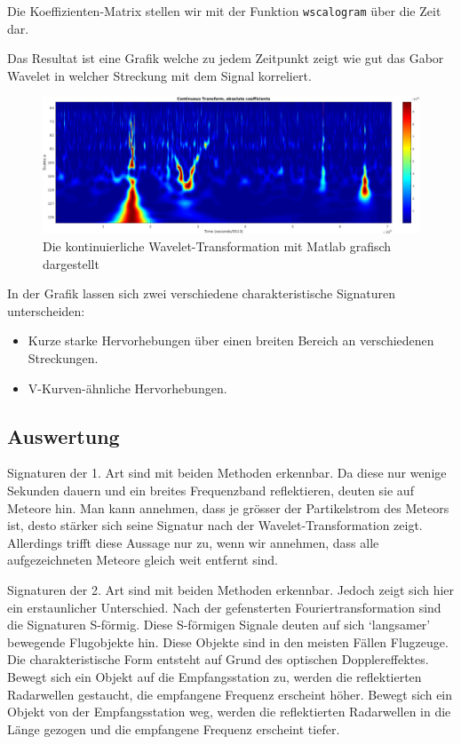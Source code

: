 \begin{refsection}
Die Koeffizienten-Matrix stellen wir mit der Funktion \texttt{wscalogram} über die Zeit dar.

Das Resultat ist eine Grafik welche zu jedem Zeitpunkt zeigt wie gut das Gabor Wavelet in welcher Streckung mit dem Signal korreliert. 

\begin{figure}
	\centering
	\includegraphics[width=\linewidth]{papers/meteor/images/signal_wscalo-clipped.png}
	\caption{Die kontinuierliche Wavelet-Transformation mit Matlab grafisch dargestellt}
	\label{fig:signalmitwscalo}
\end{figure}
In der Grafik lassen sich zwei verschiedene charakteristische Signaturen unterscheiden:
\begin{itemize}
	\item Kurze starke Hervorhebungen über einen breiten Bereich an verschiedenen Streckungen.
	\item V-Kurven-ähnliche  Hervorhebungen.
\end{itemize}

\subsection{Auswertung}
Signaturen der 1. Art sind mit beiden Methoden erkennbar.
Da diese nur wenige Sekunden dauern und ein breites Frequenzband reflektieren, deuten sie auf Meteore hin.
Man kann annehmen, dass je grösser der Partikelstrom des Meteors ist, desto stärker sich seine Signatur nach der Wavelet-Transformation zeigt.
Allerdings trifft diese Aussage nur zu, wenn wir annehmen, dass alle aufgezeichneten Meteore gleich weit entfernt sind.

Signaturen der 2. Art sind mit beiden Methoden erkennbar.
Jedoch zeigt sich hier ein erstaunlicher Unterschied.
Nach der gefensterten Fouriertransformation sind die Signaturen S-förmig.
Diese S-förmigen Signale deuten auf sich `langsamer' bewegende Flugobjekte hin.
Diese Objekte sind in den meisten Fällen Flugzeuge.
%
Die charakteristische Form entsteht auf Grund des optischen Dopplereffektes. 
%
Bewegt sich ein Objekt auf die Empfangsstation zu, werden die reflektierten Radarwellen gestaucht, die empfangene Frequenz erscheint höher.
Bewegt sich ein Objekt von der Empfangsstation weg, werden die reflektierten Radarwellen in die Länge gezogen und die empfangene Frequenz erscheint tiefer.


\end{refsection}

